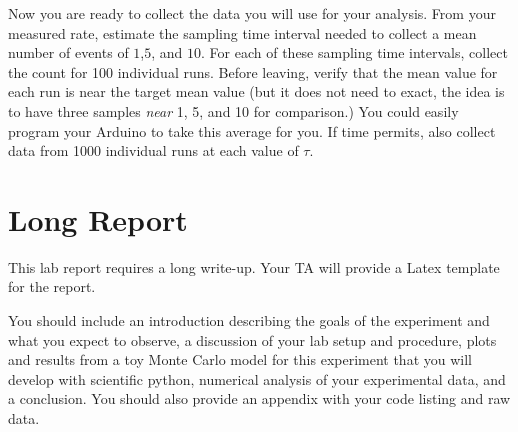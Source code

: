\documentclass[12pt]{article}
\begin{document}
Now you are ready to collect the data you will use for your analysis.  From your measured rate, estimate the sampling time interval needed to collect a mean number of events of $1$,$5$, and $10$.  For each of these sampling time intervals, collect the count for 100 individual runs.  Before leaving, verify that the mean value for each run is near the target mean value (but it does not need to exact, the idea is to have three samples {\em near} 1, 5, and 10 for comparison.)  You could easily program your Arduino to take this average for you.  If time permits, also collect data from 1000 individual runs at each value of $\tau$.

\section{Long Report}

This lab report requires a long write-up.  Your TA will provide a Latex template for the report.  

You should include an introduction describing the goals of the experiment and what you expect to observe, a discussion of your lab setup and procedure, plots and results from a toy Monte Carlo model for this experiment that you will develop with scientific python, numerical analysis of your experimental data, and a conclusion.  You should also provide an appendix with your code listing and raw data.
\end{document}
